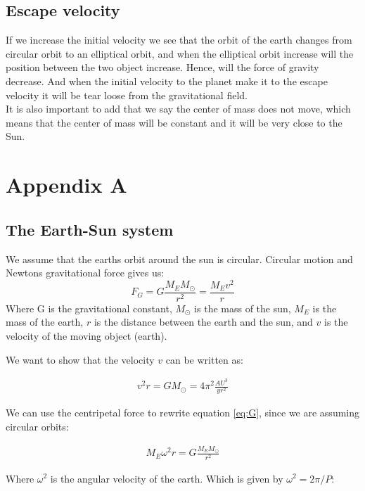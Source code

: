 \documentclass{article}
\begin{document}
\begin{multicols}{2}
\subsection{Escape velocity}
If we increase the initial velocity we see that the orbit of the earth changes from circular orbit to an elliptical orbit, and when the elliptical orbit increase will the position between the two object increase. Hence, will the force of gravity decrease. And when the initial velocity to the planet make it to the escape velocity it will be tear loose from the gravitational field.\\
It is also important to add that we say the center of mass does not move, which means that the center of mass will be constant and it will be very close to the Sun.  

\end{multicols}

\clearpage

\appendix \section{Appendix A} %
\subsection{The Earth-Sun system}
We assume that the earths orbit around the sun is circular. Circular motion and Newtons gravitational force gives us:
\begin{equation}
    F_G=G\frac{M_EM_{\odot}}{r^2}=\frac{M_Ev^2}{r}
    \label{eq:G}
\end{equation}
Where G is the gravitational constant, $M_\odot$ is the mass of the sun, $M_E$ is the mass of the earth, $r$ is the distance between the earth and the sun, and $v$ is the velocity of the moving object (earth). 

We want to show that the velocity $v$ can be written as:

\begin{align}
    v^2r=GM_{\odot}=4\pi^2\frac{AU^3}{yr^2}
    \label{eq:vr}
\end{align}

We can use the centripetal force to rewrite equation \ref{eq:G}, since we are assuming circular orbits:

\begin{align*}
    M_E\omega^2r=G\frac{M_EM_{\odot}}{r^2}
\end{align*}

Where $\omega^2$ is the angular velocity of the earth. Which is given by $\omega^2=2\pi / P$: 
\end{document}
